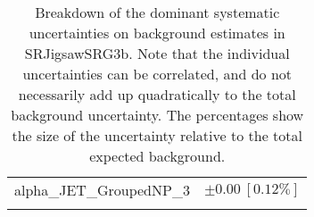 \begin{table}
\begin{center}
\begin{tabular*}{\textwidth}{@{\extracolsep{\fill}}lc}
alpha\_JET\_GroupedNP\_3         & $\pm 0.00\ [0.12\%] $       \\
\noalign{\smallskip}\hline\noalign{\smallskip}
\end{tabular*}
\end{center}
\caption[Breakdown of uncertainty on background estimates]{
Breakdown of the dominant systematic uncertainties on background estimates in SRJigsawSRG3b.
Note that the individual uncertainties can be correlated, and do not necessarily add up quadratically to 
the total background uncertainty. The percentages show the size of the uncertainty relative to the total expected background.
\label{table.results.bkgestimate.uncertainties.SRJigsawSRG3b}}
\end{table}
%